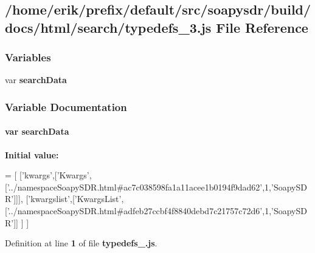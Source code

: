 \subsection{/home/erik/prefix/default/src/soapysdr/build/docs/html/search/typedefs\+\_\+3.js File Reference}
\label{typedefs__3_8js}
\subsubsection*{Variables}
\begin{DoxyCompactItemize}
\item 
var {\bf search\+Data}
\end{DoxyCompactItemize}


\subsubsection{Variable Documentation}
\paragraph[{search\+Data}]{\setlength{\rightskip}{0pt plus 5cm}var search\+Data}\label{typedefs__3_8js_ad01a7523f103d6242ef9b0451861231e}
{\bfseries Initial value\+:}
\begin{DoxyCode}
=
[
  [\textcolor{stringliteral}{'kwargs'},[\textcolor{stringliteral}{'Kwargs'},[\textcolor{stringliteral}{'../namespaceSoapySDR.html#ac7c038598fa1a11acee1b0194f9dad62'},1,\textcolor{stringliteral}{'SoapySDR'}]]],
  [\textcolor{stringliteral}{'kwargslist'},[\textcolor{stringliteral}{'KwargsList'},[\textcolor{stringliteral}{'../namespaceSoapySDR.html#adfeb27ccbf4f8840debd7c21757c72d6'},1,\textcolor{stringliteral}{'SoapySDR'}]]
      ]
]
\end{DoxyCode}


Definition at line {\bf 1} of file {\bf typedefs\+\_.\+js}.

